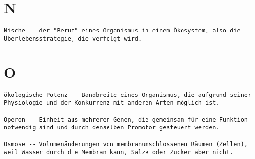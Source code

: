 \documentclass{article}
\begin{document}
\section{N}
\begin{verbatim}
Nische -- der "Beruf" eines Organismus in einem Ökosystem, also die Überlebensstrategie, die verfolgt wird.
\end{verbatim}
\newpage


\section{O}
\begin{verbatim}
ökologische Potenz -- Bandbreite eines Organismus, die aufgrund seiner Physiologie und der Konkurrenz mit anderen Arten möglich ist.

Operon -- Einheit aus mehreren Genen, die gemeinsam für eine Funktion notwendig sind und durch denselben Promotor gesteuert werden.

Osmose -- Volumenänderungen von membranumschlossenen Räumen (Zellen), weil Wasser durch die Membran kann, Salze oder Zucker aber nicht.
\end{verbatim}
\newpage
\end{document}
